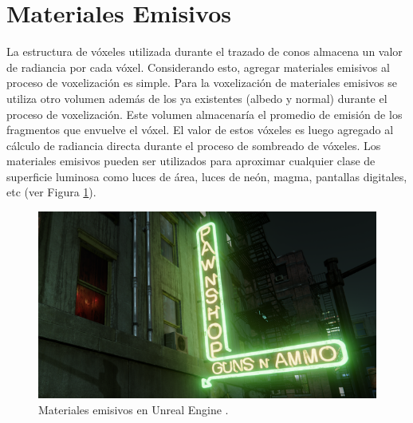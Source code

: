 \section{Materiales Emisivos} %
\label{sec:materiales_emisivos}
La estructura de vóxeles utilizada durante el trazado de conos almacena un valor de radiancia por cada vóxel. Considerando esto, agregar materiales emisivos al proceso de voxelización es simple. Para la voxelización de materiales emisivos se utiliza otro volumen además de los ya existentes (albedo y normal) durante el proceso de voxelización. Este volumen almacenaría el promedio de emisión de los fragmentos que envuelve el vóxel. El valor de estos vóxeles es luego agregado al cálculo de radiancia directa durante el proceso de sombreado de vóxeles. Los materiales emisivos pueden ser utilizados para aproximar cualquier clase de superficie luminosa como luces de área, luces de neón, magma, pantallas digitales, etc (ver Figura \ref{fig:emissive_mat}).

\begin{figure}[H]
	\centering
	\captionsetup{justification=centering}
	\includegraphics[width=0.95\linewidth]{media/emissive_neon.png}
	\caption{Materiales emisivos en Unreal Engine \cite{unreal_46}.}
	\label{fig:emissive_mat}
\end{figure}